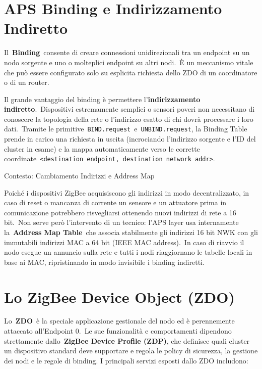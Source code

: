 \documentclass[
  italian,
  openany]{book}
\begin{document}
\section{APS Binding e Indirizzamento
Indiretto}\label{aps-binding-e-indirizzamento-indiretto}

Il~\textbf{Binding}~consente di creare connessioni unidirezionali tra un
endpoint su un nodo sorgente e uno o molteplici endpoint su altri
nodi.~È un meccanismo vitale che può essere configurato solo su
esplicita richiesta dello ZDO di un coordinatore o di un router.

Il grande vantaggio del binding è permettere l'\textbf{indirizzamento
indiretto}.~Dispositivi estremamente semplici o sensori poveri non
necessitano di conoscere la topologia della rete o l'indirizzo esatto di
chi dovrà processare i loro dati.~Tramite le
primitive~\texttt{BIND.request}~e~\texttt{UNBIND.request}, la Binding
Table prende in carico una richiesta in uscita (incrociando l'indirizzo
sorgente e l'ID del cluster in esame) e la mappa automaticamente verso
le corrette
coordinate~\texttt{\textless{}destination\ endpoint,\ destination\ network\ addr\textgreater{}}.

\begin{calloutnote}{Contesto: Cambiamento Indirizzi e Address Map }

Poiché i dispositivi ZigBee acquisiscono gli indirizzi in modo
decentralizzato, in caso di reset o mancanza di corrente un sensore e un
attuatore prima in comunicazione potrebbero risvegliarsi ottenendo nuovi
indirizzi di rete a 16 bit.~Non serve però l'intervento di un tecnico:
l'APS layer usa internamente la~\textbf{Address Map Table}~che associa
stabilmente gli indirizzi 16 bit NWK con gli immutabili indirizzi MAC a
64 bit (IEEE MAC address).~In caso di riavvio il nodo esegue un annuncio
sulla rete e tutti i nodi riaggiornano le tabelle locali in base ai MAC,
ripristinando in modo invisibile i binding indiretti.

\end{calloutnote}

\section{Lo ZigBee Device Object
(ZDO)}\label{lo-zigbee-device-object-zdo}

Lo~\textbf{ZDO}~è la speciale applicazione gestionale del nodo ed è
perennemente attaccato all'Endpoint 0.~Le sue funzionalità e
comportamenti dipendono strettamente dallo~\textbf{ZigBee Device Profile
(ZDP)}, che definisce quali cluster un dispositivo standard deve
supportare e regola le policy di sicurezza, la gestione dei nodi e le
regole di binding. I principali servizi esposti dallo ZDO includono:
\end{document}
